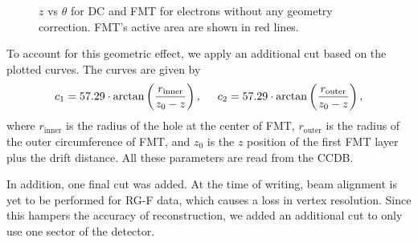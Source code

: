     \begin{figure}[t!]
        \centering{}
        \caption[$z$ vs $\theta$ for DC and FMT.]{$z$ vs $\theta$ for DC and FMT for electrons without any geometry correction. FMT's active area are shown in red lines.}
        \label{fig::vz_vs_theta}
    \end{figure}

    To account for this geometric effect, we apply an additional cut based on the plotted curves.
    The curves are given by
    \begin{equation} \label{eq::fmt_geometry_cut}
        c_1 = 57.29 \cdot \arctan\left(\frac{r_\text{inner}}{z_0 - z}\right), \hspace{0.5cm}
        c_2 = 57.29 \cdot \arctan\left(\frac{r_\text{outer}}{z_0 - z}\right),
    \end{equation}
    where $r_\text{inner}$ is the radius of the hole at the center of FMT, $r_\text{outer}$ is the radius of the outer circumference of FMT, and $z_0$ is the $z$ position of the first FMT layer plus the drift distance.
    All these parameters are read from the CCDB.

    In addition, one final cut was added.
    At the time of writing, beam alignment is yet to be performed for RG-F data, which causes a loss in vertex resolution.
    Since this hampers the accuracy of reconstruction, we added an additional cut to only use one sector of the detector.

